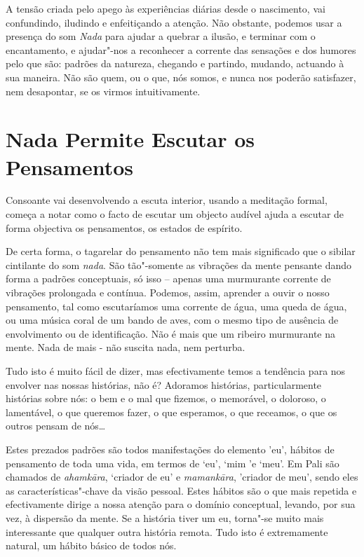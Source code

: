 A tensão criada pelo apego às experiências diárias desde o nascimento,
vai confundindo, iludindo e enfeitiçando a atenção. Não obstante,
podemos usar a presença do som \emph{Nada} para ajudar a quebrar a
ilusão, e terminar com o encantamento, e ajudar"-nos a reconhecer a
corrente das sensações e dos humores pelo que são: padrões da natureza,
chegando e partindo, mudando, actuando à sua maneira. Não são quem, ou o
que, nós somos, e nunca nos poderão satisfazer, nem desapontar, se os
virmos intuitivamente.

\section{Nada Permite Escutar os Pensamentos}

Consoante vai desenvolvendo a escuta interior, usando a meditação
formal, começa a notar como o facto de escutar um objecto audível ajuda
a escutar de forma objectiva os pensamentos, os estados de espírito.

De certa forma, o tagarelar do pensamento não tem mais significado que o
sibilar cintilante do som \emph{nada}. São tão"-somente as vibrações da
mente pensante dando forma a padrões conceptuais, só isso -- apenas uma
murmurante corrente de vibrações prolongada e contínua. Podemos, assim,
aprender a ouvir o nosso pensamento, tal como escutaríamos uma corrente
de água, uma queda de água, ou uma música coral de um bando de aves, com
o mesmo tipo de ausência de envolvimento ou de identificação. Não é mais
que um ribeiro murmurante na mente. Nada de mais - não suscita nada, nem
perturba.

Tudo isto é muito fácil de dizer, mas efectivamente temos a tendência
para nos envolver nas nossas histórias, não é? Adoramos histórias,
particularmente histórias sobre nós: o bem e o mal que fizemos, o
memorável, o doloroso, o lamentável, o que queremos fazer, o que
esperamos, o que receamos, o que os outros pensam de nós\ldots{}

Estes prezados padrões são todos manifestações do elemento 'eu', hábitos
de pensamento de toda uma vida, em termos de `eu', `mim 'e `meu'. Em
Pali são chamados de \emph{ahamkāra}, `criador de eu' e
\emph{mamankāra}, 'criador de meu', sendo eles as características"-chave
da visão pessoal. Estes hábitos são o que mais repetida e efectivamente
dirige a nossa atenção para o domínio conceptual, levando, por sua vez,
à dispersão da mente. Se a história tiver um eu, torna"-se muito mais
interessante que qualquer outra história remota. Tudo isto é
extremamente natural, um hábito básico de todos nós.

